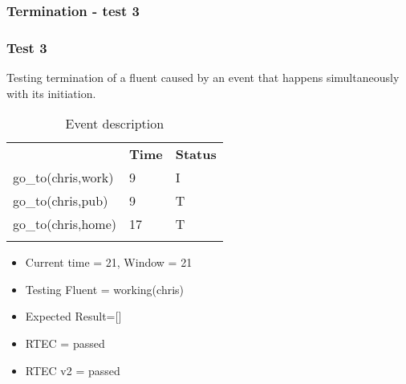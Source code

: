 \documentclass[8pt]{beamer}
\begin{document}
\begin{frame}
    \frametitle{Termination - test 3}
    \subsubsection{Test 3}
    \small
    Testing termination of a fluent caused by an event that happens simultaneously with its initiation.
    \begin{minipage}{0.48\linewidth}
        \begin{table}[t!]
            \caption{Event description}
            \begin{center}

                \begin{tabular}{lll}
                    \hline\noalign{\smallskip}
                    \multicolumn{1}{l}{\textbf{Event}} & \multicolumn{1}{c}{\textbf{Time}} & \multicolumn{1}{c}{\textbf{Status}}  \\
                    go\_to(chris,work)&9&I\\
                    go\_to(chris,pub)&9&T\\
                    go\_to(chris,home)&17&T\\
                    \noalign{\smallskip}
                    \hline
                \end{tabular}
            \end{center}
        \end{table}
        \begin{itemize}
            \item Current time = 21, Window = 21
            \item Testing Fluent = working(chris)
            \item Expected Result=[]
            \item RTEC = passed
            \item RTEC v2 = passed
        \end{itemize}
    \end{minipage}
    \begin{minipage}{0.48\linewidth}


\end{minipage}
\end{frame}
\end{document}
